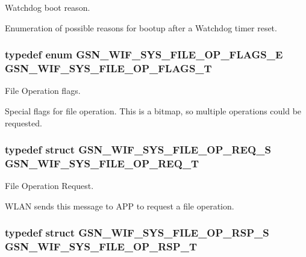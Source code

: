 Watchdog boot reason. 

Enumeration of possible reasons for bootup after a Watchdog timer reset. \hypertarget{a00639_ga7719428a1c7dead37acbe115df44fad9}{
\subsubsection[{GSN\_\-WIF\_\-SYS\_\-FILE\_\-OP\_\-FLAGS\_\-T}]{\setlength{\rightskip}{0pt plus 5cm}typedef enum {\bf GSN\_\-WIF\_\-SYS\_\-FILE\_\-OP\_\-FLAGS\_\-E}  {\bf GSN\_\-WIF\_\-SYS\_\-FILE\_\-OP\_\-FLAGS\_\-T}}}
\label{a00639_ga7719428a1c7dead37acbe115df44fad9}


File Operation flags. 

Special flags for file operation. This is a bitmap, so multiple operations could be requested. \hypertarget{a00639_ga1808a8f4a69150d0761c6d965d5527d0}{
\subsubsection[{GSN\_\-WIF\_\-SYS\_\-FILE\_\-OP\_\-REQ\_\-T}]{\setlength{\rightskip}{0pt plus 5cm}typedef struct {\bf GSN\_\-WIF\_\-SYS\_\-FILE\_\-OP\_\-REQ\_\-S}  {\bf GSN\_\-WIF\_\-SYS\_\-FILE\_\-OP\_\-REQ\_\-T}}}
\label{a00639_ga1808a8f4a69150d0761c6d965d5527d0}


File Operation Request. 

WLAN sends this message to APP to request a file operation. \hypertarget{a00639_gace03eed872f0520e74fbcb1eb8faa065}{
\subsubsection[{GSN\_\-WIF\_\-SYS\_\-FILE\_\-OP\_\-RSP\_\-T}]{\setlength{\rightskip}{0pt plus 5cm}typedef struct {\bf GSN\_\-WIF\_\-SYS\_\-FILE\_\-OP\_\-RSP\_\-S}  {\bf GSN\_\-WIF\_\-SYS\_\-FILE\_\-OP\_\-RSP\_\-T}}}
\label{a00639_gace03eed872f0520e74fbcb1eb8faa065}


